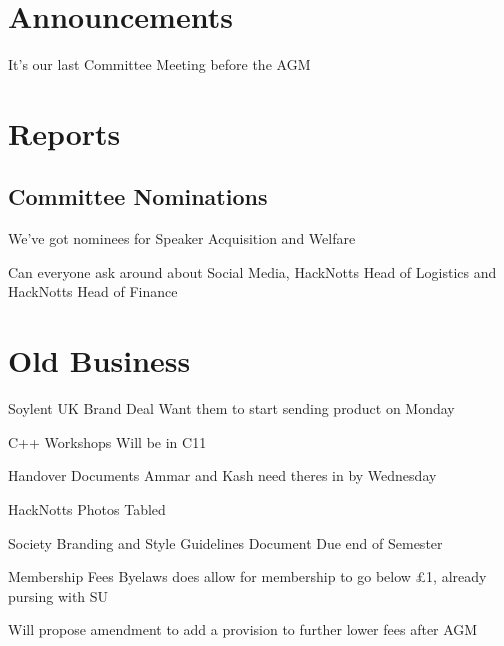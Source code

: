 \documentclass[11pt,hacksoc]{meetingmins}
\begin{document}
\maketitle

\section{Announcements}
\begin{items}
	\item
	It's our last Committee Meeting before the AGM
	
\end{items}

\section{Reports}

\subsection{Committee Nominations}
\begin{hiddensubitems}
	\item
	We've got nominees for Speaker Acquisition and Welfare
	
	\item
	Can everyone ask around about Social Media, HackNotts Head of Logistics and HackNotts Head of Finance
\end{hiddensubitems}

\section{Old Business}
\begin{items}
	\item
	Soylent UK Brand Deal
		\subitem
		Want them to start sending product on Monday
		
	\item
	C++ Workshops
		\subitem
		Will be in C11

	\item
	Handover Documents
		\subitem
		Ammar and Kash need theres in by Wednesday
	
	\item
	HackNotts Photos
		\subitem
		Tabled
	
	\item
	Society Branding and Style Guidelines Document
		\subitem
		Due end of Semester
	
	\item
	Membership Fees
		\subitem
		Byelaws does allow for membership to go below \pounds1, already pursing with SU
		
		\subitem
		Will propose amendment to add a provision to further lower fees after AGM
\end{items}
\end{document}
